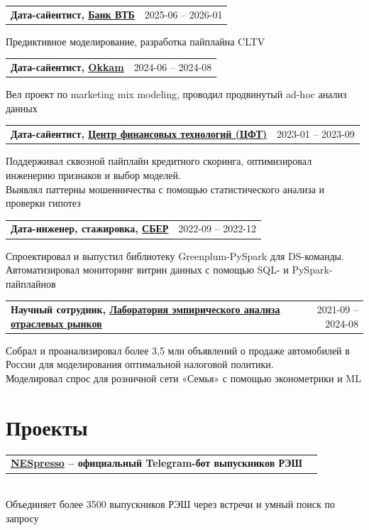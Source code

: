 \documentclass[letterpaper,11pt]{article}
\makeatletter
\newcommand{\resumeProjectHeading}[2]{
	\item
	\begin{tabular*}{0.97\textwidth}{l@{\extracolsep{\fill}}r}
		\small#1 & #2 \\
	\end{tabular*}\vspace{-7pt}
}
\makeatother
\begin{document}
\resumeProjectHeading
{\textbf{Дата-сайентист, \href{https://www.vtb.ru}{\underline{Банк ВТБ}}} \vspace{8pt}}{2025-06 -- 2026-01}
{\small{Предиктивное моделирование, разработка пайплайна CLTV}}

\resumeProjectHeading
{\textbf{Дата-сайентист, \href{https://okkam.group/}{\underline{Okkam}}} \vspace{8pt}}{2024-06 -- 2024-08}
{\small{Вел проект по marketing mix modeling, проводил продвинутый ad-hoc анализ данных}}

\resumeProjectHeading
{\textbf{Дата-сайентист, \href{https://catalog.cft.ru/}{\underline{Центр финансовых технологий (ЦФТ)}}} \vspace{8pt}}{2023-01 -- 2023-09}
{\small{Поддерживал сквозной пайплайн кредитного скоринга, оптимизировал инженерию признаков и выбор моделей. \\ Выявлял паттерны мошенничества с помощью статистического анализа и проверки гипотез}}

\resumeProjectHeading
{\textbf{Дата-инженер, стажировка,  \href{https://www.sberbank.com/index}{\underline{СБЕР}}}
	\vspace{8pt}}{2022-09 -- 2022-12}
{\small{Спроектировал и выпустил библиотеку Greenplum-PySpark для DS-команды. \\
Автоматизировал мониторинг витрин данных с помощью SQL- и PySpark-пайплайнов}}

\resumeProjectHeading
{\textbf{Научный сотрудник, \href{https://www.nsu.ru/n/media/news/obrazovanie/v-ngu-sozdana-novaya-laboratoriya-analiziruyushchaya-otraslevye-rynki/}{\underline{Лаборатория эмпирического анализа отраслевых рынков}}}
	\vspace{8pt}}{2021-09 -- 2024-08}
{\small{Собрал и проанализировал более 3,5 млн объявлений о продаже автомобилей в России для моделирования оптимальной налоговой политики. \\ Моделировал спрос для розничной сети «Семья» с помощью эконометрики и ML}}

\section{Проекты}

\resumeProjectHeading
{\textbf{\href{https://t.me/NesRandomCoffeeBot}{\underline{NESpresso}} -- официальный Telegram-бот выпускников РЭШ} \vspace{8pt}}{}
{      \\
	\small{Объединяет более 3500 выпускников РЭШ через встречи и умный поиск по запросу}}
\end{document}
